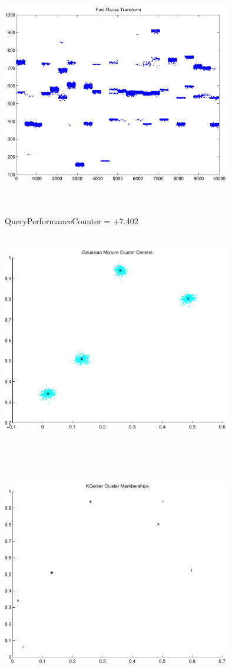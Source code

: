 \documentclass[9pt]{article}
\theoremstyle{plain}
\theoremstyle{definition}
\theoremstyle{remark}
\numberwithin{equation}{section}
\begin{document}
\includegraphics[width=10.0cm,height=10.0cm]{FGT24_Centers.pdf}

QueryPerformanceCounter  =  +7.402
\includegraphics[width=10.0cm,height=10.0cm]{GaussianMixture_ClusterCenters4_Centers.pdf}

\includegraphics[width=10.0cm,height=10.0cm]{KCenterClusterMemberships_4_Centers.pdf}
\end{document}
